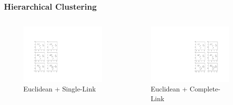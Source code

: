 \begin{frame}

	\frametitle{{\color{GradientDescentDiagramGreen}Hierarchical Clustering}}


		\begin{columns}

			\begin{figure}[!htbp]
				\centering
				\includegraphics[angle=0,width=0.75\linewidth]{images/unsupervised/hierarchical/hierarchical_single_link.pdf}
				\caption{Euclidean + Single-Link}
			\end{figure}

			\begin{figure}[!htbp]
				\centering
				\includegraphics[angle=0,width=0.75\linewidth]{images/unsupervised/hierarchical/hierarchical_complete_link.pdf}
				\caption{Euclidean + Complete-Link}
			\end{figure}

		\end{columns}


\end{frame}


